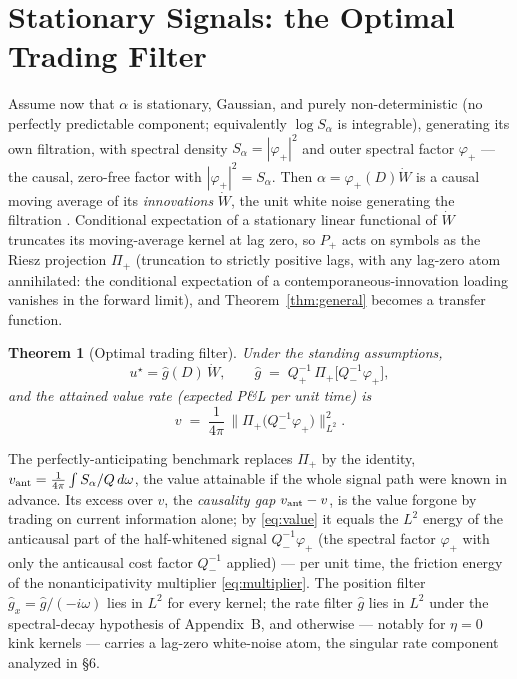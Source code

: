 \documentclass[11pt]{article}
\theoremstyle{plain}
\newtheorem{theorem}{Theorem}
\begin{document}
\section{Stationary Signals: the Optimal Trading Filter}

Assume now that $\alpha$ is stationary, Gaussian, and purely non-deterministic (no perfectly predictable component; equivalently $\log S_\alpha$ is integrable), generating its own filtration, with spectral density $S_\alpha = |\varphi_+|^2$ and outer spectral factor $\varphi_+$ --- the causal, zero-free factor with $|\varphi_+|^2 = S_\alpha$. Then $\alpha = \varphi_+(D)\dot W$ is a causal moving average of its \emph{innovations} $\dot W$, the unit white noise generating the filtration \citep{Wiener1949}. Conditional expectation of a stationary linear functional of $\dot W$ truncates its moving-average kernel at lag zero, so $P_+$ acts on symbols as the Riesz projection $\Pi_+$ (truncation to strictly positive lags, with any lag-zero atom annihilated: the conditional expectation of a contemporaneous-innovation loading vanishes in the forward limit), and Theorem~\ref{thm:general} becomes a transfer function.

\begin{theorem}[Optimal trading filter]\label{thm:filter}
Under the standing assumptions,
\begin{equation}\label{eq:filter}
u^\star = \hat g(D)\,\dot W, \qquad
\hat g \;=\; Q_+^{-1}\,\Pi_+\!\bigl[Q_-^{-1}\varphi_+\bigr],
\end{equation}
and the attained value rate (expected P\&L per unit time) is
\begin{equation}\label{eq:value}
v \;=\; \frac{1}{4\pi}\,\bigl\|\Pi_+\bigl(Q_-^{-1}\varphi_+\bigr)\bigr\|_{L^2}^2 .
\end{equation}
\end{theorem}

The perfectly-anticipating benchmark replaces $\Pi_+$ by the identity, $v_{\rm ant} = \frac{1}{4\pi}\int S_\alpha/Q\,d\omega$, the value attainable if the whole signal path were known in advance. Its excess over $v$, the \emph{causality gap} $v_{\rm ant}-v$, is the value forgone by trading on current information alone; by \eqref{eq:value} it equals the $L^2$ energy of the anticausal part of the half-whitened signal $Q_-^{-1}\varphi_+$ (the spectral factor $\varphi_+$ with only the anticausal cost factor $Q_-^{-1}$ applied) --- per unit time, the friction energy of the nonanticipativity multiplier \eqref{eq:multiplier}. The position filter $\hat g_x = \hat g/(-i\omega)$ lies in $L^2$ for every kernel; the rate filter $\hat g$ lies in $L^2$ under the spectral-decay hypothesis of Appendix~B, and otherwise --- notably for $\eta=0$ kink kernels --- carries a lag-zero white-noise atom, the singular rate component analyzed in \S6.
\end{document}
